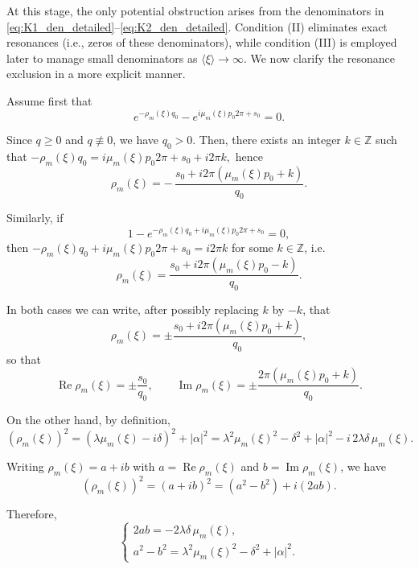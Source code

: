 \documentclass[11pt,reqno]{amsart}
\numberwithin{equation}{section}
\begin{document}
At this stage, the only potential obstruction arises from the denominators in \eqref{eq:K1_den_detailed}--\eqref{eq:K2_den_detailed}. Condition (II) eliminates exact resonances (i.e., zeros of these denominators), while condition (III) is employed later to manage small denominators as $\langle\xi\rangle\to\infty$. We now clarify the resonance exclusion in a more explicit manner.

Assume first that
\[
e^{-\rho_m(\xi)q_0}-e^{i\mu_m(\xi)p_0 2\pi+s_0}=0.
\]

Since $q\ge 0$ and $q\not\equiv 0$, we have $q_0>0$. Then, there exists an integer $k\in\mathbb{Z}$ such that \(-\rho_m(\xi)q_0 = i\mu_m(\xi)p_0 2\pi+s_0+i2\pi k,\) hence
\begin{equation*}\label{eq:rho_from_resonance_plus}
	\rho_m(\xi)= -\,\frac{s_0+i2\pi(\mu_m(\xi)p_0+k)}{q_0}.
\end{equation*}

Similarly, if
\[
1-e^{-\rho_m(\xi)q_0+i\mu_m(\xi)p_0 2\pi+s_0}=0,
\]
then $-\rho_m(\xi)q_0+i\mu_m(\xi)p_0 2\pi+s_0=i2\pi k$ for some $k\in\mathbb{Z}$, i.e.
\begin{equation*}\label{eq:rho_from_resonance_minus}
	\rho_m(\xi)= \frac{s_0+i2\pi(\mu_m(\xi)p_0-k)}{q_0}.
\end{equation*}

In both cases we can write, after possibly replacing $k$ by $-k$, that
\begin{equation}\label{eq:rho_param}
	\rho_m(\xi)=\pm\frac{s_0+i2\pi(\mu_m(\xi)p_0+k)}{q_0},
\end{equation}
so that
\[\operatorname{Re}\rho_m(\xi)=\pm\frac{s_0}{q_0},\qquad
\operatorname{Im}\rho_m(\xi)=\pm\frac{2\pi(\mu_m(\xi)p_0+k)}{q_0}.
\]

On the other hand, by definition,
\[
(\rho_m(\xi))^2=(\lambda\mu_m(\xi)-i\delta)^2+|\alpha|^2
=\lambda^2\mu_m(\xi)^2-\delta^2+|\alpha|^2-i\,2\lambda\delta\,\mu_m(\xi).
\]

Writing $\rho_m(\xi)=a+ib$ with $a=\operatorname{Re}\rho_m(\xi)$ and $b=\operatorname{Im}\rho_m(\xi)$, we have
\[
(\rho_m(\xi))^2=(a+ib)^2=(a^2-b^2)+i(2ab).
\]

Therefore,
\begin{equation}\label{eq:ab_system}
	\begin{cases}
		2ab=-2\lambda\delta\,\mu_m(\xi),\\[2mm]
		a^2-b^2=\lambda^2\mu_m(\xi)^2-\delta^2+|\alpha|^2.
	\end{cases}
\end{equation}
\end{document}
